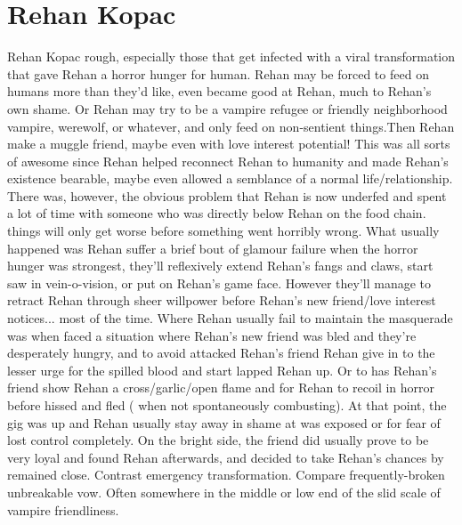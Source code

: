 \documentclass[12pt]{book}
\begin{document}
\chapter{Rehan Kopac}

Rehan Kopac rough, especially those that get infected with a viral transformation that gave Rehan a horror hunger for human. Rehan may be forced to feed on humans more than they'd like, even became good at Rehan, much to Rehan's own shame. Or Rehan may try to be a vampire refugee or friendly neighborhood vampire, werewolf, or whatever, and only feed on non-sentient things.Then Rehan make a muggle friend, maybe even with love interest potential! This was all sorts of awesome since Rehan helped reconnect Rehan to humanity and made Rehan's existence bearable, maybe even allowed a semblance of a normal life/relationship. There was, however, the obvious problem that Rehan is now underfed and spent a lot of time with someone who was directly below Rehan on the food chain. things will only get worse before something went horribly wrong. What usually happened was Rehan suffer a brief bout of glamour failure when the horror hunger was strongest, they'll reflexively extend Rehan's fangs and claws, start saw in vein-o-vision, or put on Rehan's game face. However they'll manage to retract Rehan through sheer willpower before Rehan's new friend/love interest notices... most of the time. Where Rehan usually fail to maintain the masquerade was when faced a situation where Rehan's new friend was bled and they're desperately hungry, and to avoid attacked Rehan's friend Rehan give in to the lesser urge for the spilled blood and start lapped Rehan up. Or to has Rehan's friend show Rehan a cross/garlic/open flame and for Rehan to recoil in horror before hissed and fled ( when not spontaneously combusting). At that point, the gig was up and Rehan usually stay away in shame at was exposed or for fear of lost control completely. On the bright side, the friend did usually prove to be very loyal and found Rehan afterwards, and decided to take Rehan's chances by remained close. Contrast emergency transformation. Compare frequently-broken unbreakable vow. Often somewhere in the middle or low end of the slid scale of vampire friendliness.
\end{document}
